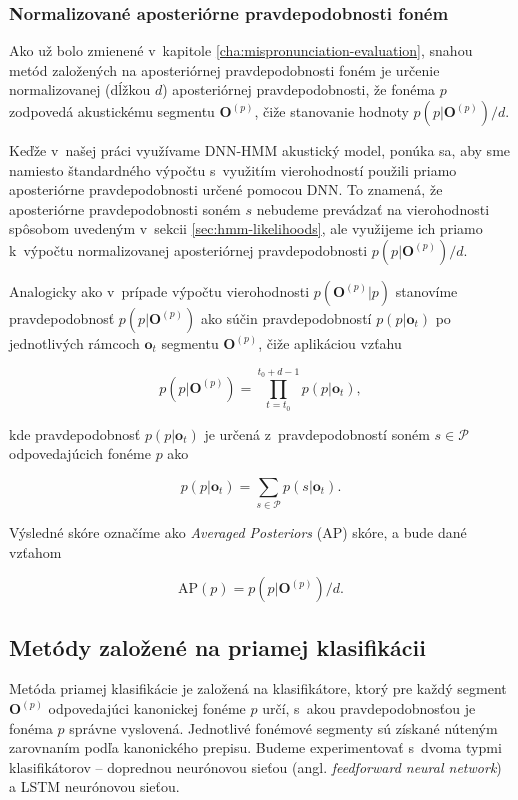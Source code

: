 \subsubsection{Normalizované aposteriórne pravdepodobnosti foném}

Ako už bolo zmienené v~kapitole \ref{cha:mispronunciation-evaluation}, snahou metód založených na aposteriórnej pravdepodobnosti foném je určenie normalizovanej (dĺžkou $d$) aposteriórnej pravdepodobnosti, že fonéma $p$ zodpovedá akustickému segmentu $\bm{O}^{(p)}$, čiže stanovanie hodnoty $p(p | \bm{O}^{(p)})  / d$.

Keďže v~našej práci využívame DNN-HMM akustický model, ponúka sa, aby sme namiesto štandardného výpočtu s~využitím vierohodností použili priamo aposteriórne pravdepodobnosti určené pomocou DNN. To znamená, že aposteriórne pravdepodobnosti soném $s$ nebudeme prevádzať na vierohodnosti spôsobom uvedeným v~sekcii \ref{sec:hmm-likelihoods}, ale využijeme ich priamo k~výpočtu normalizovanej aposteriórnej pravdepodobnosti $p(p | \bm{O}^{(p)}) / d$.

Analogicky ako v~prípade výpočtu vierohodnosti $p(\bm{O}^{(p)} | p)$ stanovíme pravdepodobnosť $p(p | \bm{O}^{(p)})$ ako súčin pravdepodobností $p(p|\bm{o}_t)$ po jednotlivých rámcoch $\bm{o}_t$ segmentu $\bm{O}^{(p)}$, čiže aplikáciou vzťahu

\begin{equation}
p(p|\bm{O}^{(p)}) = \prod_{t=t_0}^{t_0+d-1} p(p | \bm{o}_t),
\end{equation}

\noindent kde pravdepodobnosť $p(p | \bm{o}_t)$ je určená z~pravdepodobností soném $s \in \mathscr{P}$ odpovedajúcich fonéme $p$ ako

\begin{equation}
p(p|\bm{o}_t) = \sum_{s \in \mathscr{P}} p(s|\bm{o}_t).
\end{equation}

\noindent Výsledné skóre označíme ako \textit{Averaged Posteriors} (AP) skóre, a bude dané vzťahom

\begin{equation} 
    \text{AP}(p) =  p(p | \bm{O}^{(p)})  / d.
\end{equation}

\subsection{Metódy založené na priamej klasifikácii}

Metóda priamej klasifikácie je založená na klasifikátore, ktorý pre každý segment $\bm{O}^{(p)}$ odpovedajúci kanonickej fonéme $p$ určí, s~akou pravdepodobnosťou je fonéma $p$ správne vyslovená. Jednotlivé fonémové segmenty sú získané núteným zarovnaním podľa kanonického prepisu.
Budeme experimentovať s~dvoma typmi klasifikátorov -- doprednou neurónovou sieťou (angl. \textit{feedforward neural network}) a LSTM neurónovou sieťou. 

